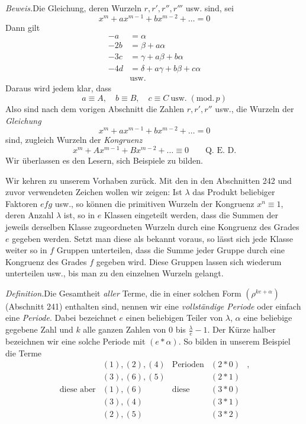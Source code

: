 \emph{Beweis.}\quad Die Gleichung, deren Wurzeln $r,r',r'',r'''$ usw. sind, sei
\[
x^m+ax^{m-1}+bx^{m-2}+\ldots=0
\]
Dann gilt
\[
\begin{aligned}
-a&=\alpha\\
-2b&=\beta+a\alpha\\
-3c&=\gamma+a\beta+b\alpha\\
-4d&=\delta+a\gamma+b\beta+c\alpha\\
&\text{usw.}
\end{aligned}
\]
Daraus wird jedem klar, dass
\[
a\equiv A,\quad b\equiv B,\quad c\equiv C\ \text{usw.}\;(\mathrm{mod.}\,p)
\]
Also sind nach dem vorigen Abschnitt die Zahlen $r,r',r''$ usw., die Wurzeln der \emph{Gleichung}
\[
x^m+ax^{m-1}+bx^{m-2}+\ldots=0
\]
sind, zugleich Wurzeln der \emph{Kongruenz}
\[
x^m+Ax^{m-1}+Bx^{m-2}+\ldots\equiv0\qquad\text{Q. E. D.}
\]
Wir überlassen es den Lesern, sich Beispiele zu bilden.

Wir kehren zu unserem Vorhaben zurück. Mit den in den Abschnitten 242 und zuvor verwendeten Zeichen wollen wir zeigen: Ist $\lambda$ das Produkt beliebiger Faktoren
$efg$ usw., so können die primitiven Wurzeln der Kongruenz $x^n\equiv1$, deren Anzahl $\lambda$ ist, so in $e$ Klassen eingeteilt werden, dass die Summen der jeweils derselben Klasse zugeordneten Wurzeln durch eine Kongruenz des Grades $e$ gegeben werden. Setzt man diese als bekannt voraus, so lässt sich jede Klasse weiter so in $f$ Gruppen unterteilen, dass die Summe jeder Gruppe durch eine Kongruenz des Grades $f$ gegeben wird. Diese Gruppen lassen sich wiederum unterteilen usw., bis man zu den einzelnen Wurzeln gelangt.

\emph{Definition.}\quad Die Gesamtheit \emph{aller} Terme, die in einer solchen Form $(\rho^{ke+\alpha})$ (Abschnitt 241) enthalten sind, nennen wir eine \emph{vollständige Periode} oder einfach eine \emph{Periode}. Dabei bezeichnet $e$ einen beliebigen Teiler von $\lambda$, $\alpha$ eine beliebige gegebene Zahl und $k$ alle ganzen Zahlen von $0$ bis $\frac{\lambda}{e}-1$. Der Kürze halber bezeichnen wir eine solche Periode mit $(e\ast\alpha)$. So bilden in unserem Beispiel die Terme
\[
\begin{array}{rclcl}
&(1),(2),(4)&\text{Perioden}&(2\ast0)&\text{,}\\
&(3),(6),(5)&&(2\ast1)&\\
\text{diese aber}&(1),(6)&\text{diese}&(3\ast0)&\\
&(3),(4)&&(3\ast1)&\\
&(2),(5)&&(3\ast2)&
\end{array}
\]

